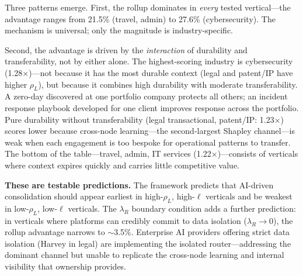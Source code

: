 \documentclass[12pt]{article}
\theoremstyle{definition}
\begin{document}
Three patterns emerge. First, the rollup dominates in \textit{every} tested vertical---the advantage ranges from 21.5\% (travel, admin) to 27.6\% (cybersecurity). The mechanism is universal; only the magnitude is industry-specific.

Second, the advantage is driven by the \textit{interaction} of durability and transferability, not by either alone. The highest-scoring industry is cybersecurity (1.28$\times$)---not because it has the most durable context (legal and patent/IP have higher $\rho_L$), but because it combines high durability with moderate transferability. A zero-day discovered at one portfolio company protects all others; an incident response playbook developed for one client improves response across the portfolio. Pure durability without transferability (legal transactional, patent/IP: 1.23$\times$) scores lower because cross-node learning---the second-largest Shapley channel---is weak when each engagement is too bespoke for operational patterns to transfer. The bottom of the table---travel, admin, IT services (1.22$\times$)---consists of verticals where context expires quickly and carries little competitive value.

\textbf{These are testable predictions.} The framework predicts that AI-driven consolidation should appear earliest in high-$\rho_L$, high-$\ell$ verticals and be weakest in low-$\rho_L$, low-$\ell$ verticals. The $\lambda_R$ boundary condition adds a further prediction: in verticals where platforms can credibly commit to data isolation ($\lambda_R \to 0$), the rollup advantage narrows to $\sim$3.5\%. Enterprise AI providers offering strict data isolation (Harvey in legal) are implementing the isolated router---addressing the dominant channel but unable to replicate the cross-node learning and internal visibility that ownership provides.
\end{document}
